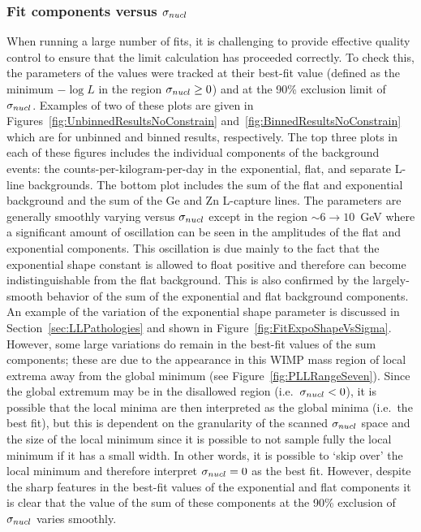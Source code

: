 			\subsubsection{Fit components versus \texorpdfstring{$\sigma_{nucl}$}{sigma\_nuc}}
When running a large number of fits, it is challenging to provide effective quality control to ensure that the limit calculation has proceeded correctly.  To check this, the parameters of the values were tracked at their best-fit value (defined as the minimum $-\log L$ in the region $\sigma_{nucl}\geq0$) and at the 90\% exclusion limit of $\sigma_{nucl}$.  Examples of two of these plots are given in Figures~\ref{fig:UnbinnedResultsNoConstrain} and~\ref{fig:BinnedResultsNoConstrain} which are for unbinned and binned results, respectively.  The top three plots in each of these figures includes the individual components of the background events: the counts-per-kilogram-per-day in the exponential, flat, and separate L-line backgrounds.  The bottom plot includes the sum of the flat and exponential background and the sum of the Ge and Zn L-capture lines.  The parameters are generally smoothly varying versus $\sigma_{nucl}$ except in the region $\sim6\to10$~GeV where a significant amount of oscillation can be seen in the amplitudes of the flat and exponential components.  This oscillation is due mainly to the fact that the exponential shape constant is allowed to float positive and therefore can become indistinguishable from the flat background.  This is also confirmed by the largely-smooth behavior of the sum of the exponential and flat background components.  An example of the variation of the exponential shape parameter is discussed in Section~\ref{sec:LLPathologies} and shown in Figure~\ref{fig:FitExpoShapeVsSigma}.  However, some large variations do remain in the best-fit values of the sum components; these are due to the appearance in this WIMP mass region of local extrema away from the global minimum (see Figure~\ref{fig:PLLRangeSeven}).  Since the global extremum may be in the disallowed region (i.e.~$\sigma_{nucl}<0$), it is possible that the local minima are then interpreted as the global minima (i.e.~the best fit), but this is dependent on the granularity of the scanned $\sigma_{nucl}$ space and the size of the local minimum since it is possible to not sample fully the local minimum if it has a small width.  In other words, it is possible to `skip over' the local minimum and therefore interpret $\sigma_{nucl}=0$ as the best fit.  However, despite the sharp features in the best-fit values of the exponential and flat components it is clear that the value of the sum of these components at the 90\% exclusion of $\sigma_{nucl}$ varies smoothly.  

